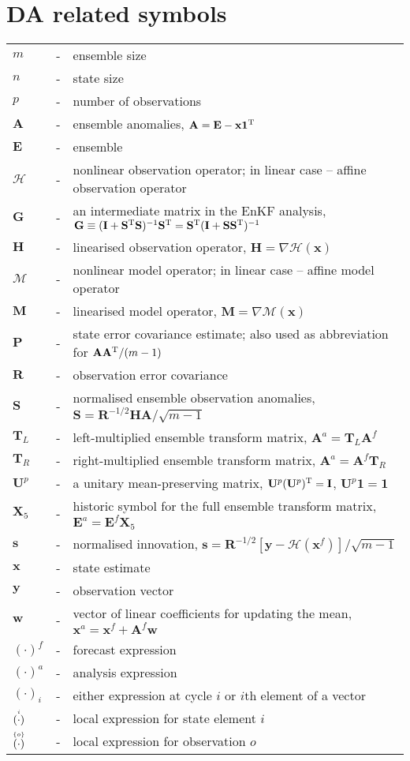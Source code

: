 \documentclass[11pt]{report}
\newcommand{\mb} {\mathbf}
\newcommand{\T}{^{\tiny \mathrm T}}
\newcommand{\ac}{\accentset}
\begin{document}
\section*{DA related symbols}
\begin{tabular}{lll}
  $m$ &-& ensemble size \\
  $n$ &-& state size \\
  $p$ &-& number of observations \\
  $\mb A$ &-& ensemble anomalies, $\mb A = \mb E - \mb x \mb 1\T$ \\
  $\mb E$ &-& ensemble \\
  $\mathcal H$ &-& nonlinear observation operator; in linear case -- affine observation operator \\
  $\mb G$ &-& an intermediate matrix in the EnKF analysis, $\mb G \equiv (\mb I + \mb S\T \mb S)^{-1} \mb S\T = \mb S\T ( \mb I + \mb S \mb S\T)^{-1}$ \\
  $\mb H$ &-& linearised observation operator, $\mb H = \nabla \mathcal H(\mb x)$ \\
  $\mathcal M$ &-& nonlinear model operator; in linear case -- affine model operator \\
  $\mb M$ &-& linearised model operator, $\mb M = \nabla \mathcal M(\mb x)$ \\
  $\mb P$ &-& state error covariance estimate; also used as abbreviation for $\mb A \mb A\T / (m - 1)$ \\
  $\mb R$ &-& observation error covariance \\
  $\mb S$ &-& normalised ensemble observation anomalies, $\mb S = \mb R^{-1/2} \mb {HA} / \sqrt{m - 1}$ \\
  $\mb T_L$ &-& left-multiplied ensemble transform matrix, $\mb A^a = \mb T_L \mb A^f$ \\
  $\mb T_R$ &-& right-multiplied ensemble transform matrix, $\mb A^a = \mb A^f \mb T_R$ \\
  $\mb U^p$ &-& a unitary mean-preserving matrix, $\mb U^p (\mb U^p) \T = \mb I$, $\mb U^p \mb 1 = \mb 1$ \\
  $\mb X_5$ &-& historic symbol for the full ensemble transform matrix, $\mb E^a = \mb E^f \mb X_5$ \\ 
  $\mb s$ &-& normalised innovation, $\mb s = \mb R^{-1/2} \left[ \mb y - \mathcal H (\mb x^f) \right] / \sqrt{m - 1}$ \\
  $\mb x$ &-& state estimate \\
  $\mb y$ &-& observation vector \\
  $\mb w$ &-& vector of linear coefficients for updating the mean, $\mb x^a = \mb x^f + \mb A^f \mb w$ \\
  $(\cdot)^f$ &-& forecast expression \\
  $(\cdot)^a$ &-& analysis expression \\
  $(\cdot)_i$ &-& either expression at cycle $i$ or $i$th element of a vector \\
  $\ac{i}{(\cdot)}$ &-& local expression for state element $i$ \\
  $\ac{\{o\}}{(\cdot)}$ &-& local expression for observation $o$
\end{tabular}
\end{document}
